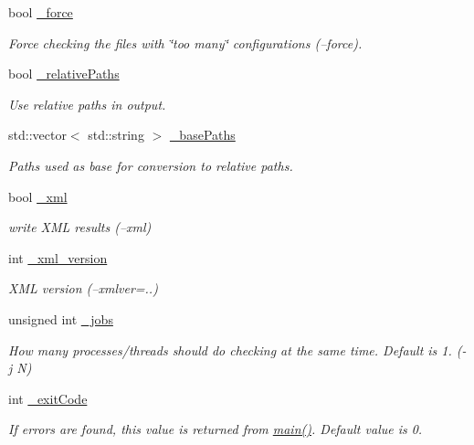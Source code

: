 \begin{DoxyCompactItemize}
bool \hyperlink{class_settings_a308bf6973159f94f1889c1008fe08b5d}{\-\_\-force}
\begin{DoxyCompactList}\small\item\em Force checking the files with \char`\"{}too many\char`\"{} configurations (--force). \end{DoxyCompactList}\item 
bool \hyperlink{class_settings_ab99c72c997d7b2f6f8985c0ced0881ac}{\-\_\-relative\-Paths}
\begin{DoxyCompactList}\small\item\em Use relative paths in output. \end{DoxyCompactList}\item 
std\-::vector$<$ std\-::string $>$ \hyperlink{class_settings_afadd19fdbdf1c1c2be908a60ba92f23f}{\-\_\-base\-Paths}
\begin{DoxyCompactList}\small\item\em Paths used as base for conversion to relative paths. \end{DoxyCompactList}\item 
bool \hyperlink{class_settings_ab657e8c6731499441e902246a0697be0}{\-\_\-xml}
\begin{DoxyCompactList}\small\item\em write X\-M\-L results (--xml) \end{DoxyCompactList}\item 
int \hyperlink{class_settings_abfe06684500ddd333513a0b0c2abb023}{\-\_\-xml\-\_\-version}
\begin{DoxyCompactList}\small\item\em X\-M\-L version (--xmlver=..) \end{DoxyCompactList}\item 
unsigned int \hyperlink{class_settings_ad1d32f22bf496ef134ce83512b3179a6}{\-\_\-jobs}
\begin{DoxyCompactList}\small\item\em How many processes/threads should do checking at the same time. Default is 1. (-\/j N) \end{DoxyCompactList}\item 
int \hyperlink{class_settings_a7404d25f5be389944f9a602da9c47c92}{\-\_\-exit\-Code}
\begin{DoxyCompactList}\small\item\em If errors are found, this value is returned from \hyperlink{cli_2main_8cpp_a0ddf1224851353fc92bfbff6f499fa97}{main()}. Default value is 0. \end{DoxyCompactList}\item 

\end{DoxyCompactItemize}
